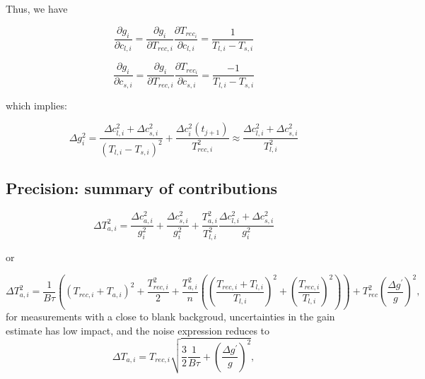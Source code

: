 Thus, we have

\begin{equation}
 \frac{\partial g_{i}}{\partial c_{l,i}} = \frac{\partial g_{i}}{\partial T_{rec,i}}\frac{\partial T_{rec_{i}}}{\partial c_{l,i}}=
\frac{1}{T_{l,i}-T_{s,i}} 
\end{equation}

\begin{equation}
 \frac{\partial g_{i}}{\partial c_{s,i}} = \frac{\partial g_{i}}{\partial T_{rec,i}}\frac{\partial T_{rec_{i}}}{\partial c_{s,i}} =
\frac{-1}{T_{l,i}-T_{s,i}} 
\end{equation}

which implies:

\begin{equation}
\Delta g_{i}^{2} =  \frac{\Delta c_{l,i}^{2} + \Delta c_{s,i}^{2}}{(T_{l,i}-T_{s,i})^2} + \frac{ \Delta c_{i}^{2}(t_{j+1})}{T_{rec,i}^{2}}
\approx \frac{\Delta c_{l,i}^{2} + \Delta c_{s,i}^{2}}{T_{l,i}^2}
\end{equation}
 

\subsection*{Precision: summary of contributions}

\begin{equation}
\Delta T_{a,i}^{2} =  \frac{\Delta c_{a,i}^{2}}{g_{i}^2} + \frac{\Delta c_{s,i}^{2}}{g_{i}^2} +
     \frac{T_{a,i}^{2}}{T_{l,i}^2} \frac{\Delta c_{l,i}^{2} + \Delta c_{s,i}^{2}}{g_{i}^{2}}
\end{equation}

or

\begin{equation}
\Delta T_{a,i}^{2} =  \frac{1}{B\tau} \left( (T_{rec,i}+T_{a,i})^2 + \frac{T_{rec,i}^2}{2} + 
   \frac{T_{a,i}^{2}}{n} \left( \left( \frac{T_{rec,i} + T_{l,i}}{T_{l,i}} \right)^2 + \left( \frac{T_{rec,i} }{T_{l,i}} \right)^2 \right) \right) 
   + T_{rec}^{2}\left(\frac{\Delta g^{'}}{g}\right)^{2},
\end{equation}
for measurements with a close to blank backgroud, uncertainties in the gain estimate has low impact, and
the noise expression reduces to
\begin{equation}
\Delta T_{a,i} =  T_{rec,i}\sqrt{\frac{3}{2}\frac{1}{B\tau} + \left(\frac{\Delta g^{'}}{g}\right)^{2} },
\end{equation}


